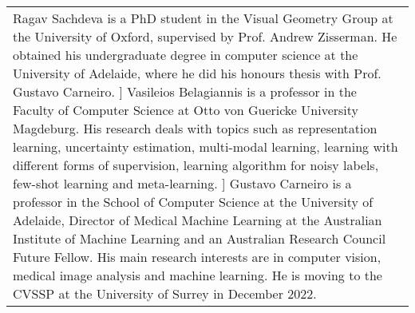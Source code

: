 \documentclass[review]{elsarticle}
\theoremstyle{plain}
\begin{document}


\newpage

\begin{minipage}{0.3\textwidth}
\end{minipage}\hfill
\begin{minipage}{0.60\textwidth}\fontsize{8pt}{12pt}\selectfont
\begin{tabular}{p{\textwidth}}
\thispagestyle{empty}
Ragav Sachdeva is a PhD student in the Visual Geometry Group at the University of Oxford, supervised by Prof. Andrew Zisserman. He obtained his undergraduate degree in computer science at the University of Adelaide, where he did his honours thesis with Prof. Gustavo Carneiro.
\1\baselineskip]
Vasileios Belagiannis is a professor in the Faculty of Computer Science at Otto von Guericke University Magdeburg. His research deals with topics such as representation learning, uncertainty estimation, multi-modal learning, learning with different forms of supervision, learning algorithm for noisy labels, few-shot learning and meta-learning.
\1\baselineskip]
Gustavo Carneiro is a professor in the School of Computer Science at the University of Adelaide, Director of Medical Machine Learning at the Australian Institute of Machine Learning and an Australian Research Council Future Fellow. His main research interests are in computer vision, medical image analysis and machine learning. He is moving to the CVSSP at the University of Surrey in December 2022.

\end{tabular}
\end{minipage}
\end{document}
